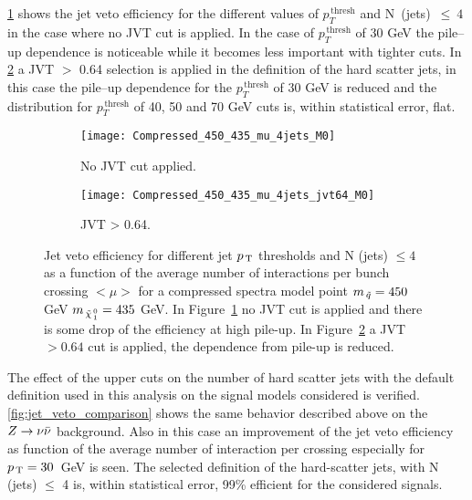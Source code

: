 \cref{fig:comp_4jets_nojvt} shows the jet veto efficiency for the different
values of $p_T^{\mathrm{\, thresh}}$ and N~(jets)~$\leq~4$ in the case where no
JVT cut is applied. In the case of $p_T^{\mathrm{\, thresh}}$ of 30 GeV the
pile--up dependence is noticeable while it becomes less important with tighter
cuts. In \cref{fig:comp_4jets_jvt64} a JVT $>$ 0.64 selection is applied in the
definition of the hard scatter jets, in this case the pile--up dependence for
the $p_T^{\mathrm{\, thresh}}$ of 30 GeV is reduced and the distribution for
$p_T^{\mathrm{\, thresh}}$ of 40, 50 and 70 GeV cuts is, within statistical
error, flat.
\begin{figure}[!h]
  \centering
  \begin{subfigure}[t]{.48\linewidth}
    \texttt{[image: Compressed\_450\_435\_mu\_4jets\_M0]}
    \caption{No JVT cut applied.}
    \label{fig:comp_4jets_nojvt}
  \end{subfigure}
  \begin{subfigure}[t]{.48\linewidth}
    \texttt{[image: Compressed\_450\_435\_mu\_4jets\_jvt64\_M0]}
    \caption{JVT > 0.64.}
    \label{fig:comp_4jets_jvt64}
  \end{subfigure}
  \caption{Jet veto efficiency for different jet $p_\mathrm{\, T}$ thresholds and N (jets)
    $\leq 4$ as a function of the average number of interactions per bunch
    crossing $<\mu>$ for a compressed spectra model point $m_{\, \tilde{q}} = 450$ GeV
    $m_{\, \tilde{\chi}_{\, 1}^{\, 0}} = 435$ GeV. In Figure~\ref{fig:comp_4jets_nojvt} no JVT cut is
    applied and there is some drop of the efficiency at high pile-up. In
    Figure~\ref{fig:comp_4jets_jvt64} a JVT $> 0.64$ cut is applied, the
    dependence from pile-up is reduced.}
  \label{fig:comp_eff}
\end{figure}
The effect of the upper cuts on the number of hard scatter jets with the default
definition used in this analysis on the signal models considered is
verified. \cref{fig:jet_veto_comparison} shows the same behavior described above
on the $Z \rightarrow \nu \bar{\nu}$ background. Also in this case an improvement of the jet veto
efficiency as function of the average number of interaction per crossing
especially for $p_\mathrm{\, T} = 30$~GeV is seen. The selected definition of the
hard-scatter jets, with N (jets) $\leq$ 4 is, within statistical error, 99\%
efficient for the considered signals.
